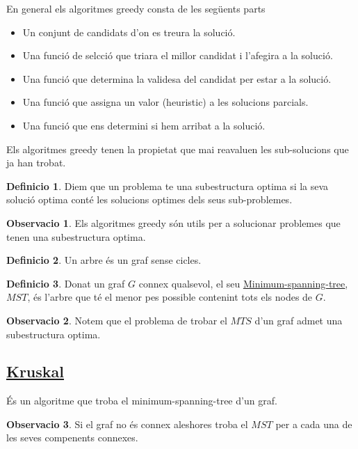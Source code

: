 \documentclass[12pt]{article}
\theoremstyle{definition}
\newtheorem{definicio}{Definicio}
\theoremstyle{definition}
\theoremstyle{definition}
\newtheorem{obs}{Observacio}
\theoremstyle{definition}
\theoremstyle{definition}
\theoremstyle{definition}
\theoremstyle{definition}
\begin{document}
En general els algoritmes greedy consta de les següents parts
\begin{itemize}
	\item Un conjunt de candidats d'on es treura la solució.
	\item Una funció de selcció que triara el millor candidat i l'afegira a la solució.
	\item Una funció que determina la validesa del candidat per estar a la solució.
	\item Una funció que assigna un valor (heuristic) a les solucions parcials.
	\item Una funció que ens determini si hem arribat a la solució.
\end{itemize}
Els algoritmes greedy tenen la propietat que mai reavaluen les sub-solucions que ja han trobat.

\begin{definicio}
Diem que un problema te una subestructura optima si la seva solució optima conté les solucions optimes dels seus sub-problemes.
\end{definicio}

\begin{obs}
Els algoritmes greedy són utils per a solucionar problemes que tenen una subestructura optima.
\end{obs}

\begin{definicio}
Un arbre és un graf sense cicles.
\end{definicio}

\begin{definicio}
Donat un graf $G$ connex qualsevol, el seu \href{https://en.wikipedia.org/wiki/Minimum_spanning_tree}{\underline{Minimum-spanning-tree}}, $MST$, és l'arbre que té el menor pes possible contenint tots els nodes de $G$.
\end{definicio}

\begin{obs}
Notem que el problema de trobar el $MTS$ d'un graf admet una subestructura optima.
\end{obs}

\subsection{\href{https://tinyurl.com/7ms67ss}{\color{blue}Kruskal}}

És un algoritme que troba el minimum-spanning-tree d'un graf.

\begin{obs}
Si el graf no és connex aleshores troba el $MST$ per a cada una de les seves compenents connexes.
\end{obs}
\end{document}
